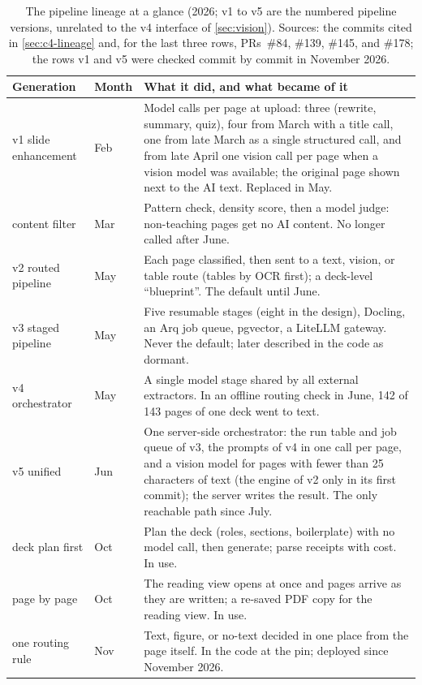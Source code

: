 \begin{table}[tp]
  \centering
  \small
  \caption{The pipeline lineage at a glance (2026; v1 to v5 are the numbered
    pipeline versions, unrelated to the v4 interface of \cref{sec:vision}).
    Sources: the commits cited in \cref{sec:c4-lineage} and, for the last
    three rows, PRs~\#84, \#139, \#145, and \#178; the rows v1 and v5 were
    checked commit by commit in November 2026.}
  \label{tab:lineage}
  \begin{tabular}{@{}llp{}@{}}
    \toprule
    Generation & Month & What it did, and what became of it \\
    \midrule
    v1 slide enhancement & Feb & Model calls per page at upload: three
      (rewrite, summary, quiz), four from March with a title call, one from
      late March as a single structured call, and from late April one vision
      call per page when a vision model was available; the original page
      shown next to the AI text. Replaced in May. \\
    content filter & Mar & Pattern check, density score, then a model
      judge: non-teaching pages get no AI content. No longer called after
      June. \\
    v2 routed pipeline & May & Each page classified, then sent to a text,
      vision, or table route (tables by OCR first); a deck-level ``blueprint''. The default until June. \\
    v3 staged pipeline & May & Five resumable stages (eight in the design),
      Docling, an Arq job queue, pgvector, a LiteLLM gateway. Never the
      default; later described in the code as dormant. \\
    v4 orchestrator & May & A single model stage shared by all external
      extractors. In an offline routing check in June, 142 of 143 pages of
      one deck went to text. \\
    v5 unified & Jun & One server-side orchestrator: the run table and job
      queue of v3, the prompts of v4 in one call per page, and a vision model
      for pages with fewer than 25 characters of text (the engine of v2 only
      in its first commit); the server writes the result. The only reachable
      path since July. \\
    deck plan first & Oct & Plan the deck (roles, sections, boilerplate) with
      no model call, then generate; parse receipts with cost. In use. \\
    page by page & Oct & The reading view opens at once and pages arrive as
      they are written; a re-saved PDF copy for the reading view. In use. \\
    one routing rule & Nov & Text, figure, or no-text decided in one place
      from the page itself. In the code at the pin; deployed since November
      2026. \\
    \bottomrule
  \end{tabular}
\end{table}


